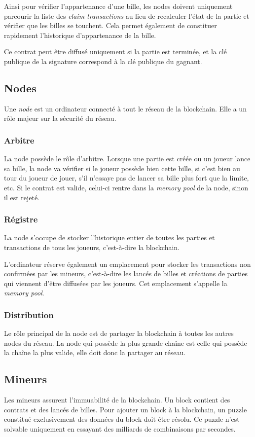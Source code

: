 \documentclass{article}
\begin{document}
Ainsi pour vérifier l'appartenance d'une bille, les nodes doivent uniquement parcourir la liste des \textit{claim transactions} au lieu de recalculer l'état de la partie et vérifier que les billes se touchent. 
Cela permet également de constituer rapidement l'historique d'appartenance de la bille. 

Ce contrat peut être diffusé uniquement si la partie est terminée, et la clé publique de la signature correspond à la clé publique du gagnant.

\subsection{Nodes}
Une \textit{node} est un ordinateur connecté à tout le réseau de la blockchain. Elle a un rôle majeur sur la sécurité du réseau.

\subsubsection{Arbitre}
La node possède le rôle d'arbitre.
Lorsque une partie est créée ou un joueur lance sa bille, la node va vérifier si le joueur possède bien cette bille, si c'est bien au tour du joueur de jouer, s'il n'essaye pas de lancer sa bille plus fort que la limite, etc.
Si le contrat est valide, celui-ci rentre dans la \textit{memory pool} de la node, sinon il est rejeté.

\subsubsection{Régistre}
La node s'occupe de stocker l'historique entier de toutes les parties et transactions de tous les joueurs, c'est-à-dire la blockchain.

L'ordinateur réserve également un emplacement pour stocker les transactions non confirmées par les mineurs, c'est-à-dire les lancés de billes et créations de parties qui viennent d'être diffusées par les joueurs. Cet emplacement s'appelle la \textit{memory pool}.

\subsubsection{Distribution}
Le rôle principal de la node est de partager la blockchain à toutes les autres nodes du réseau. 
La node qui possède la plus grande chaîne est celle qui possède la chaîne la plus valide, elle doit donc la partager au réseau.

\subsection{Mineurs}
Les mineurs assurent l'immuabilité de la blockchain.
Un block contient des contrats et des lancés de billes. Pour ajouter un block à la blockchain, un puzzle constitué exclusivement des données du block doit être résolu. Ce puzzle n'est solvable uniquement en essayant des milliards de combinaisons par secondes.
\end{document}
